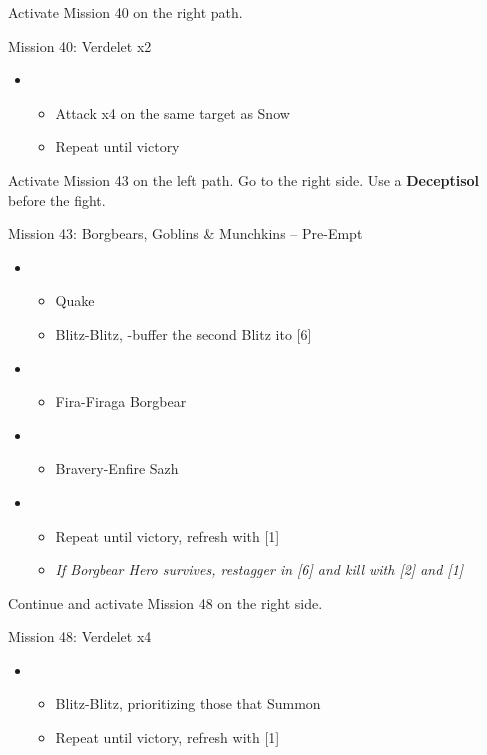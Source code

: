 Activate Mission 40 on the right path.

\begin{battle}{Mission 40: Verdelet x2}
	\begin{itemize}
		\item \fourth
			\begin{itemize}
				\item Attack x4 on the same target as Snow
				\item Repeat until victory
			\end{itemize}
	\end{itemize}
\end{battle}

Activate Mission 43 on the left path.
Go to the right side.
Use a \textbf{Deceptisol} before the fight.

\begin{battle}{{Mission 43: Borgbears, Goblins \& Munchkins -- Pre-Empt}}
	\begin{itemize}
		\item \second
			\begin{itemize}
				\item Quake
				\item Blitz-Blitz, \rav-buffer the second Blitz ito [6]
			\end{itemize}
		\item \sixth
			\begin{itemize}
				\item Fira-Firaga Borgbear
			\end{itemize}
		\item \third
			\begin{itemize}
				\item Bravery-Enfire Sazh
			\end{itemize}
		\item \second
			\begin{itemize}
				\item Repeat until victory, refresh with [1]
				\item \textit{If Borgbear Hero survives, restagger in [6] and kill with [2] and [1]}
			\end{itemize}
	\end{itemize}
\end{battle}

Continue and activate Mission 48 on the right side.

\begin{battle}{Mission 48: Verdelet x4}
	\begin{itemize}
		\item \second
			\begin{itemize}
				\item Blitz-Blitz, prioritizing those that Summon
				\item Repeat until victory, refresh with [1]
			\end{itemize}
	\end{itemize}
\end{battle}

